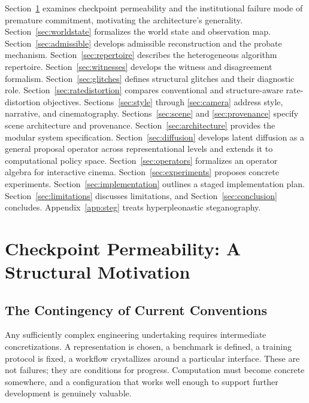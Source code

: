 \documentclass[12pt,a4paper]{article}
\theoremstyle{plain}
\theoremstyle{definition}
\theoremstyle{remark}
\begin{document}
Section~\ref{sec:motivation} examines checkpoint permeability and the institutional failure mode of premature commitment, motivating the architecture's generality. Section~\ref{sec:worldstate} formalizes the world state and observation map. Section~\ref{sec:admissible} develops admissible reconstruction and the probate mechanism. Section~\ref{sec:repertoire} describes the heterogeneous algorithm repertoire. Section~\ref{sec:witnesses} develops the witness and disagreement formalism. Section~\ref{sec:glitches} defines structural glitches and their diagnostic role. Section~\ref{sec:ratedistortion} compares conventional and structure-aware rate-distortion objectives. Sections~\ref{sec:style} through \ref{sec:camera} address style, narrative, and cinematography. Sections~\ref{sec:scene} and \ref{sec:provenance} specify scene architecture and provenance. Section~\ref{sec:architecture} provides the modular system specification. Section~\ref{sec:diffusion} develops latent diffusion as a general proposal operator across representational levels and extends it to computational policy space. Section~\ref{sec:operators} formalizes an operator algebra for interactive cinema. Section~\ref{sec:experiments} proposes concrete experiments. Section~\ref{sec:implementation} outlines a staged implementation plan. Section~\ref{sec:limitations} discusses limitations, and Section~\ref{sec:conclusion} concludes. Appendix~\ref{app:steg} treats hyperpleonastic steganography.

\section{Checkpoint Permeability: A Structural Motivation}
\label{sec:motivation}

\subsection{The Contingency of Current Conventions}

Any sufficiently complex engineering undertaking requires intermediate concretizations. A representation is chosen, a benchmark is defined, a training protocol is fixed, a workflow crystallizes around a particular interface. These are not failures; they are conditions for progress. Computation must become concrete somewhere, and a configuration that works well enough to support further development is genuinely valuable.
\end{document}
